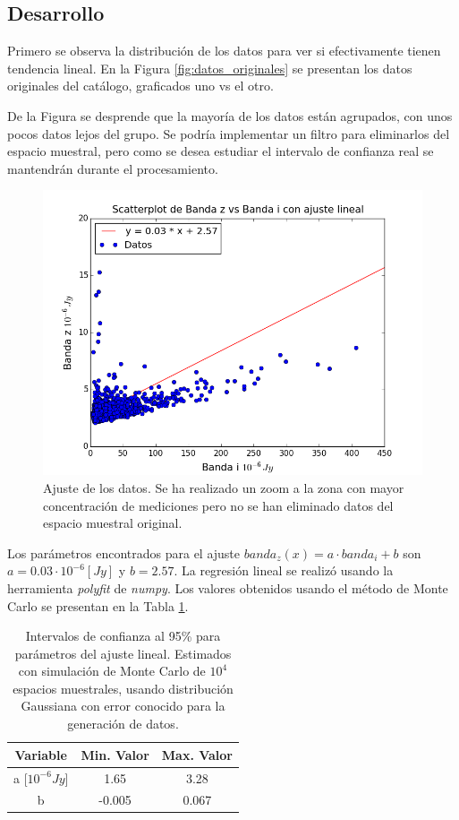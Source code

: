 \documentclass{article}
\begin{document}
\subsection{Desarrollo}

Primero se observa la distribución de los datos para ver si efectivamente tienen tendencia lineal. En la Figura \ref{fig:datos_originales} se presentan los datos originales del catálogo, graficados uno vs el otro.


De la Figura se desprende que la mayoría de los datos están agrupados, con unos pocos datos lejos del grupo. Se podría implementar un filtro para eliminarlos del espacio muestral, pero como se desea estudiar el intervalo de confianza real se mantendrán durante el procesamiento.

\begin{figure}[ht]
  \centering
  \includegraphics[scale=0.5]{images/datos_fit.png}
  \caption{Ajuste de los datos. Se ha realizado un zoom a la zona con mayor concentración de mediciones pero no se han eliminado datos del espacio muestral original.}
  \label{fig:datos_fit}
\end{figure}

Los parámetros encontrados para el ajuste $ banda_z(x) = a \cdot banda_i + b$ son $a = 0.03 \cdot 10^{-6}[Jy]$ y $b=2.57$. La regresión lineal se realizó usando la herramienta \emph{polyfit} de \emph{numpy}. Los valores obtenidos usando el método de Monte Carlo se presentan en la Tabla \ref{tab:montecarlo}.

\begin{table}[ht]
  \centering
  \begin{tabular}{|c|c|c|}
    \hline
    Variable & Min. Valor & Max. Valor \\
    \hline
    a [$10^{-6}Jy$] & 1.65 & 3.28\\
    \hline
    b & -0.005 & 0.067\\
    \hline 
  \end{tabular}
  \caption{Intervalos de confianza al 95\% para parámetros del ajuste lineal. Estimados con simulación de Monte Carlo de $10^4$ espacios muestrales, usando distribución Gaussiana con error conocido para la generación de datos.}
  \label{tab:montecarlo}
\end{table}
\end{document}
